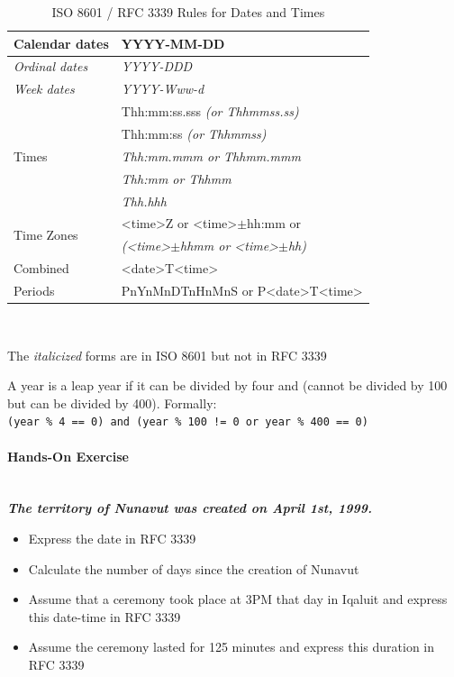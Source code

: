 \begin{table}
\centering
\renewcommand{\arraystretch}{1.25}

\begin{tabular}{l|l} \hline
	Calendar dates & YYYY-MM-DD  \\ \hline
	\textit{Ordinal dates} & \textit{YYYY-DDD} \\ \hline
	\textit{Week dates} & \textit{YYYY-Www-d} \\ \hline
	\multirow{5}{*}{Times} & Thh:mm:ss.sss \textit{(or Thhmmss.ss)} \\
	& Thh:mm:ss \textit{(or Thhmmss)} \\
	& \textit{Thh:mm.mmm or Thhmm.mmm} \\
	& \textit{Thh:mm or Thhmm} \\
	& \textit{Thh.hhh} \\ \hline
	\multirow{2}{*}{Time Zones} & <time>Z or <time>$\pm$hh:mm or \\
	& \textit{(<time>$\pm$hhmm or <time>$\pm$hh)} \\ \hline
	Combined & <date>T<time> \\
	Periods & PnYnMnDTnHnMnS or P<date>T<time> \\ \hline
\end{tabular} \\ \vspace{.5\baselineskip}

\small The \textit{italicized} forms are in ISO 8601 but not in RFC 3339
\caption{ISO 8601 / RFC 3339 Rules for Dates and Times}
\label{tab:iso8601}
\end{table}

\begin{tcolorbox}[colback=alert]
A year is a leap year if it can be divided by four and (cannot be divided by 100 but can be divided by 400). Formally: \\
\small
\texttt{(year \% 4 == 0) and (year \% 100 != 0 or year \% 400 == 0)}
\normalsize
\end{tcolorbox}
 
\begin{tcolorbox}[colback=code]
\paragraph*{Hands-On Exercise} 

\textit{\textbf{\vspace{3mm} \\The territory of Nunavut was created on April 1st, 1999. \vspace{3mm}}}

\begin{itemize}
	\item Express the date in RFC 3339
	\item Calculate the number of days since the creation of Nunavut
	\item Assume that a ceremony took place at 3PM that day in Iqaluit and express this date-time in RFC 3339
	\item Assume the ceremony lasted for 125 minutes and express this duration in RFC 3339
\end{itemize}
\end{tcolorbox}

